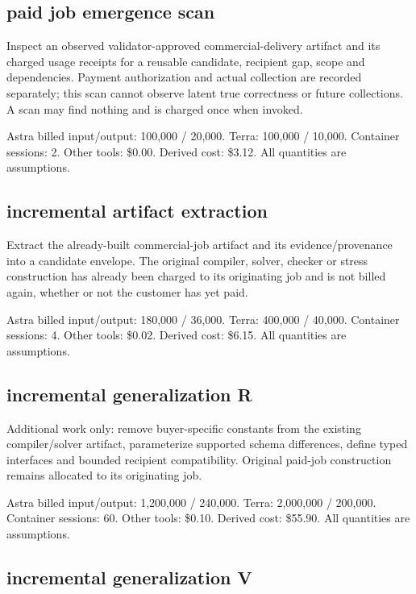 \documentclass[10pt]{article}
\newcommand{\usd}[1]{\$#1}
\begin{document}
\subsection*{paid job emergence scan}

Inspect an observed validator-approved commercial-delivery artifact and its charged usage receipts for a reusable candidate, recipient gap, scope and dependencies. Payment authorization and actual collection are recorded separately; this scan cannot observe latent true correctness or future collections. A scan may find nothing and is charged once when invoked.

Astra billed input/output: 100,000 / 20,000. Terra: 100,000 / 10,000. Container sessions: 2. Other tools: \usd{0.00}. Derived cost: \usd{3.12}. All quantities are assumptions.

\subsection*{incremental artifact extraction}

Extract the already-built commercial-job artifact and its evidence/provenance into a candidate envelope. The original compiler, solver, checker or stress construction has already been charged to its originating job and is not billed again, whether or not the customer has yet paid.

Astra billed input/output: 180,000 / 36,000. Terra: 400,000 / 40,000. Container sessions: 4. Other tools: \usd{0.02}. Derived cost: \usd{6.15}. All quantities are assumptions.

\subsection*{incremental generalization R}

Additional work only: remove buyer-specific constants from the existing compiler/solver artifact, parameterize supported schema differences, define typed interfaces and bounded recipient compatibility. Original paid-job construction remains allocated to its originating job.

Astra billed input/output: 1,200,000 / 240,000. Terra: 2,000,000 / 200,000. Container sessions: 60. Other tools: \usd{0.10}. Derived cost: \usd{55.90}. All quantities are assumptions.

\subsection*{incremental generalization V}
\end{document}
